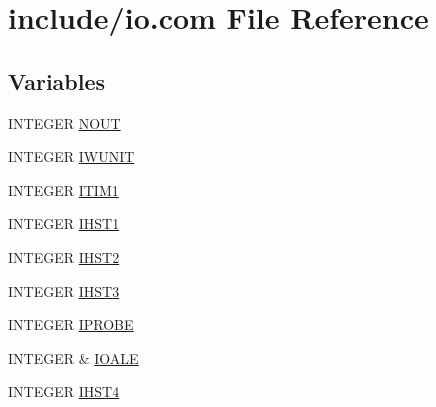 \hypertarget{home_2abonfi_2_c_f_d__codes_2_eul_f_s_83_84_2include_2io_8com}{\section{include/io.com File Reference}
\label{home_2abonfi_2_c_f_d__codes_2_eul_f_s_83_84_2include_2io_8com}
}
\subsection*{Variables}
\begin{DoxyCompactItemize}
\item 
I\-N\-T\-E\-G\-E\-R \hyperlink{home_2abonfi_2_c_f_d__codes_2_eul_f_s_83_84_2include_2io_8com_aeba7952d454c55ab9bc084b8c6f57e33}{N\-O\-U\-T}
\item 
I\-N\-T\-E\-G\-E\-R \hyperlink{home_2abonfi_2_c_f_d__codes_2_eul_f_s_83_84_2include_2io_8com_aa9185ed656abac771c2c35c8cc03d905}{I\-W\-U\-N\-I\-T}
\item 
I\-N\-T\-E\-G\-E\-R \hyperlink{home_2abonfi_2_c_f_d__codes_2_eul_f_s_83_84_2include_2io_8com_a6f18619936ee945afce62c678dfde10f}{I\-T\-I\-M1}
\item 
I\-N\-T\-E\-G\-E\-R \hyperlink{home_2abonfi_2_c_f_d__codes_2_eul_f_s_83_84_2include_2io_8com_aad736aba81e9536b88069c08ca8e4f19}{I\-H\-S\-T1}
\item 
I\-N\-T\-E\-G\-E\-R \hyperlink{home_2abonfi_2_c_f_d__codes_2_eul_f_s_83_84_2include_2io_8com_ab952683be255e3f14b5e99749855df18}{I\-H\-S\-T2}
\item 
I\-N\-T\-E\-G\-E\-R \hyperlink{home_2abonfi_2_c_f_d__codes_2_eul_f_s_83_84_2include_2io_8com_a2a9a7a7858f9c5e518984424d8e76db7}{I\-H\-S\-T3}
\item 
I\-N\-T\-E\-G\-E\-R \hyperlink{home_2abonfi_2_c_f_d__codes_2_eul_f_s_83_84_2include_2io_8com_ac78fec03b038d9855f9e7bd52236485b}{I\-P\-R\-O\-B\-E}
\item 
I\-N\-T\-E\-G\-E\-R \& \hyperlink{home_2abonfi_2_c_f_d__codes_2_eul_f_s_83_84_2include_2io_8com_af3a420e98cd1488f16cf7fc91a9cc47a}{I\-O\-A\-L\-E}
\item 
I\-N\-T\-E\-G\-E\-R \hyperlink{home_2abonfi_2_c_f_d__codes_2_eul_f_s_83_84_2include_2io_8com_a327b93c1358b3026bb2b496c88b06de9}{I\-H\-S\-T4}
\end{DoxyCompactItemize}


